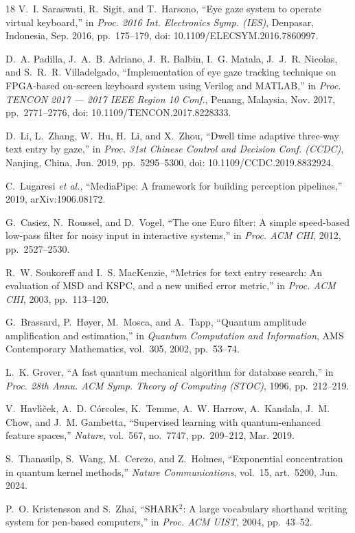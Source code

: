 \documentclass[conference]{IEEEtran}
\begin{document}
\begin{thebibliography}{18}
V.~I. Saraswati, R.~Sigit, and T.~Harsono, ``Eye gaze system to operate virtual
keyboard,'' in \emph{Proc. 2016 Int. Electronics Symp. (IES)}, Denpasar,
Indonesia, Sep. 2016, pp.~175--179, doi: 10.1109/ELECSYM.2016.7860997.

D.~A. Padilla, J.~A.~B. Adriano, J.~R. Balbin, I.~G. Matala, J.~J.~R. Nicolas,
and S.~R.~R. Villadelgado, ``Implementation of eye gaze tracking technique on
FPGA-based on-screen keyboard system using Verilog and MATLAB,'' in
\emph{Proc. TENCON 2017 --- 2017 IEEE Region 10 Conf.}, Penang, Malaysia,
Nov. 2017, pp.~2771--2776, doi: 10.1109/TENCON.2017.8228333.

D.~Li, L.~Zhang, W.~Hu, H.~Li, and X.~Zhou, ``Dwell time adaptive three-way
text entry by gaze,'' in \emph{Proc. 31st Chinese Control and Decision Conf.
(CCDC)}, Nanjing, China, Jun. 2019, pp.~5295--5300,
doi: 10.1109/CCDC.2019.8832924.

C.~Lugaresi \emph{et al.}, ``MediaPipe: A framework for building perception
pipelines,'' 2019, arXiv:1906.08172.

G.~Casiez, N.~Roussel, and D.~Vogel, ``The one Euro filter: A simple speed-based
low-pass filter for noisy input in interactive systems,'' in \emph{Proc. ACM
CHI}, 2012, pp.~2527--2530.

R.~W. Soukoreff and I.~S. MacKenzie, ``Metrics for text entry research: An
evaluation of MSD and KSPC, and a new unified error metric,'' in
\emph{Proc. ACM CHI}, 2003, pp.~113--120.

G.~Brassard, P.~H{\o}yer, M.~Mosca, and A.~Tapp, ``Quantum amplitude
amplification and estimation,'' in \emph{Quantum Computation and Information},
AMS Contemporary Mathematics, vol.~305, 2002, pp.~53--74.

L.~K. Grover, ``A fast quantum mechanical algorithm for database search,'' in
\emph{Proc. 28th Annu. ACM Symp. Theory of Computing (STOC)}, 1996,
pp.~212--219.

V.~Havl\'{\i}\v{c}ek, A.~D. C\'orcoles, K.~Temme, A.~W. Harrow, A.~Kandala,
J.~M. Chow, and J.~M. Gambetta, ``Supervised learning with quantum-enhanced
feature spaces,'' \emph{Nature}, vol.~567, no.~7747, pp.~209--212, Mar. 2019.

S.~Thanasilp, S.~Wang, M.~Cerezo, and Z.~Holmes, ``Exponential concentration in
quantum kernel methods,'' \emph{Nature Communications}, vol.~15, art.~5200,
Jun. 2024.

P.~O. Kristensson and S.~Zhai, ``SHARK$^2$: A large vocabulary shorthand writing
system for pen-based computers,'' in \emph{Proc. ACM UIST}, 2004, pp.~43--52.

\end{thebibliography}
\end{document}

